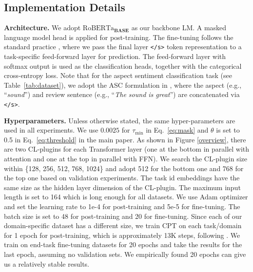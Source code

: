 \documentclass[11pt]{article}
\begin{document}
{\color{black}\subsection{Implementation Details} \textbf{Architecture.} We adopt $\text{RoBERTa}_{\textbf{BASE}}$ as our backbone LM. A masked language model head is applied for post-training. The fine-tuning follows the standard practice \cite{DBLP:conf/naacl/DevlinCLT19}, where we pass the final layer \texttt{</s>} token representation to a task-specific feed-forward layer for prediction. The feed-forward layer with softmax output is used as the classification heads, together with the categorical cross-entropy loss. Note that for the aspect sentiment classification task (see Table~\ref{tab:dataset}), we adopt the ASC formulation in \cite{DBLP:conf/naacl/XuLSY19}, where the aspect (e.g., ``\textit{sound}'') and review sentence (e.g., ``\textit{The sound is great}'') are concatenated via \texttt{</s>}. 

\textbf{Hyperparameters.}
Unless otherwise stated, the same hyper-parameters are used in all experiments.  We use $0.0025$ for $\tau_{\min}$ in Eq.~\ref{eq:mask} and $\theta$ is set to 0.5 in Eq.~\ref{eq:threshold} in the main paper. 
As shown in Figure \ref{overview}, there are two CL-plugins for each Transformer layer (one at the bottom in parallel with attention and one at the top in parallel with FFN). We search the CL-plugin size within \{128, 256, 512, 768, 1024\} and adopt 512 for the bottom one and 768 for the top one based on validation experiments. The task id embeddings have the same size as the hidden layer dimension of the CL-plugin.
The maximum input length is set to 164 which is long enough for all datasets. We use Adam optimizer and set the learning rate to 1e-4 for post-training and 5e-5 for fine-tuning. The batch size is set to 48 for post-training and 20 for fine-tuning. Since each of our domain-specific dataset has a different size, we train CPT on each task/domain for 1 epoch for post-training, which is approximately 13K steps, following \cite{DBLP:conf/acl/GururanganMSLBD20,DBLP:conf/naacl/XuLSY19}. We train on end-task fine-tuning datasets for 20 epochs and take the results for the last epoch, assuming no validation sets. We empirically found 20 epochs can give us a relatively stable results.} 
\end{document}
